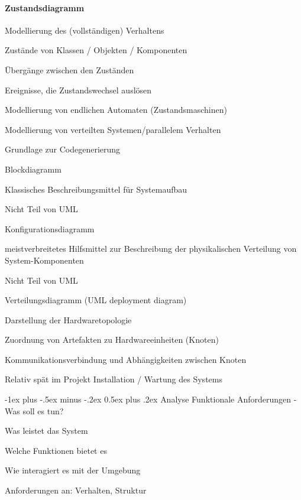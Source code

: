 \documentclass[a4paper]{article}
\makeatletter
\renewcommand{\section}{\@startsection{section}{1}{0mm}%
                                {-1ex plus -.5ex minus -.2ex}%
                                {0.5ex plus .2ex}%
                                {\normalfont\large\bfseries}}
\makeatother
\begin{document}
\begin{multicols}{3}
  \paragraph{Zustandsdiagramm}
  \begin{itemize*}
    \item Modellierung des (vollständigen) Verhaltens
    \begin{itemize*}
      \item Zustände von Klassen / Objekten / Komponenten
      \item Übergänge zwischen den Zuständen
      \item Ereignisse, die Zustandswechsel auslösen
    \end{itemize*}
    \item Modellierung von endlichen Automaten (Zustandsmaschinen)
    \item Modellierung von verteilten Systemen/parallelem Verhalten
    \item Grundlage zur Codegenerierung
  \end{itemize*}

  Blockdiagramm
  \begin{itemize*}
    \item Klassisches Beschreibungsmittel für Systemaufbau
    \item Nicht Teil von UML
  \end{itemize*}

  Konfigurationsdiagramm
  \begin{itemize*}
    \item meistverbreitetes Hilfsmittel zur Beschreibung der physikalischen Verteilung von System-Komponenten
    \item Nicht Teil von UML
  \end{itemize*}

  Verteilungsdiagramm (UML deployment diagram)
  \begin{itemize*}
    \item Darstellung der Hardwaretopologie
    \item Zuordnung von Artefakten zu Hardwareeinheiten (Knoten)
    \item Kommunikationsverbindung und Abhängigkeiten zwischen Knoten
    \item Relativ spät im Projekt Installation / Wartung des Systems
  \end{itemize*}

  \newpage
  \section{Analyse}
  Funktionale Anforderungen - Was soll es tun?
  \begin{itemize*}
    \item Was leistet das System
    \item Welche Funktionen bietet es
    \item Wie interagiert es mit der Umgebung
    \item Anforderungen an: Verhalten, Struktur
  \end{itemize*}


\end{multicols}
\end{document}
